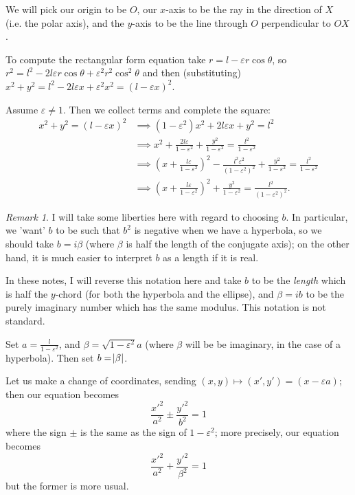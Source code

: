 \documentclass[a4paper,leqno,10pt]{article}
\theoremstyle{exercise}
\theoremstyle{plain}
\theoremstyle{definition}
\theoremstyle{remark}
\newtheorem*{rem}{Remark}
\begin{document}
We will pick our origin to be $ O $, our $ x$-axis to be the ray in the direction of $ X $ (i.e. the polar axis), and the $ y$-axis to be
the line through $ O $ perpendicular to $ OX $.

To compute the rectangular form equation take $ r = l - \varepsilon r \cos \theta $, so $ r^2 = l^2 - 2l\varepsilon r \cos\theta + \varepsilon^2 r^2 \cos^2\theta $
and then (substituting) $ x^2 + y^2 = l^2 - 2l\varepsilon x + \varepsilon^2 x^2 = (l - \varepsilon x)^2 $.

Assume $ \varepsilon \neq 1 $. Then we collect terms and complete the square:
\begin{align*}
  x^2 + y^2 = (l - \varepsilon x)^2 &\implies (1 - \varepsilon^2)x^2 + 2l\varepsilon x + y^2 = l^2\\
                                    &\implies x^2 + \frac{2l\varepsilon}{1 - \varepsilon^2} + \frac{y^2}{1 - \varepsilon^2} = \frac{l^2}{1 - \varepsilon^2}\\
                                    &\implies \left(x + \frac{l\varepsilon}{1 - \varepsilon^2}\right)^2 - \frac{l^2 \varepsilon^2}{(1 - \varepsilon^2)^2} + \frac{y^2}{1 - \varepsilon^2} = \frac{l^2}{1 - \varepsilon^2}\\
                                    &\implies \left(x + \frac{l\varepsilon}{1 - \varepsilon^2}\right)^2 + \frac{y^2}{1 - \varepsilon^2} = \frac{l^2}{(1 - \varepsilon^2)^2}.
\end{align*}

\begin{rem}
  I will take some liberties here with regard to choosing $ b $. In particular, we 'want' $ b $ to be such that $ b^2 $ is negative when we have
  a hyperbola, so we should take $ b = i\beta $ (where $ \beta $ is half the length of the conjugate axis); on the other hand, it is much
  easier to interpret $ b $ as a length if it is real.

  In these notes, I will reverse this notation here and take $ b $ to be the \emph{length} which is half the $ y$-chord (for both the hyperbola and the ellipse),
  and $ \beta = ib $ to be the purely imaginary number which has the same modulus. This notation is not standard.
\end{rem}

Set $ a = \frac{l}{1 - \varepsilon^2} $, and $ \beta = \sqrt{1 - \varepsilon^2}a $ (where $ \beta $ will be be imaginary, in the case of a hyperbola).
Then set $ b = \abs{\beta} $.

Let us make a change of coordinates, sending $ (x,y) \mapsto (x',y') = (x - \varepsilon a) $; then our equation becomes
\begin{equation}\label{eqn:generalconic}
  \frac{{x'}^2}{a^2} \pm \frac{{y'}^2}{b^2} = 1
\end{equation}
where the sign $ \pm $ is the same as the sign of $ 1 - \varepsilon^2 $; more precisely, our equation becomes
\begin{equation}\label{eqn:generalconic}
  \frac{{x'}^2}{a^2} + \frac{{y'}^2}{\beta^2} = 1
\end{equation}
but the former is more usual.
\end{document}
